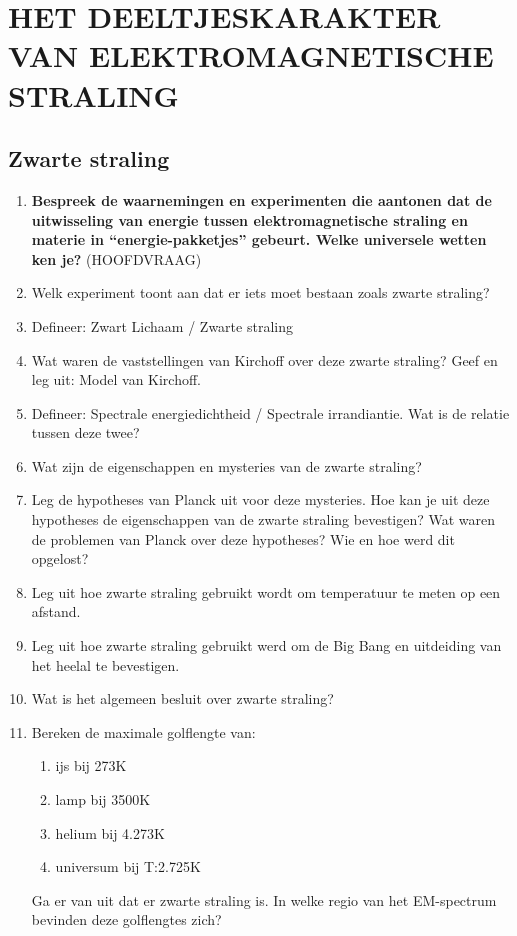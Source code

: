 \documentclass[12pt]{article}
\begin{document}
    \maketitle

    \section{HET DEELTJESKARAKTER VAN ELEKTROMAGNETISCHE STRALING}
    \subsection{Zwarte straling}
    \begin{enumerate}
        \item \textbf{Bespreek de waarnemingen en experimenten die aantonen dat de uitwisseling van energie tussen elektromagnetische straling en materie in “energie-pakketjes” gebeurt. Welke universele wetten ken je?} (HOOFDVRAAG)
        \item Welk experiment toont aan dat er iets moet bestaan zoals zwarte straling?
        \item Defineer: Zwart Lichaam / Zwarte straling
        \item Wat waren de vaststellingen van Kirchoff over deze zwarte straling? Geef en leg uit: Model van Kirchoff.
        \item Defineer: Spectrale energiedichtheid / Spectrale irrandiantie. Wat is de relatie tussen deze twee?
        \item Wat zijn de eigenschappen en mysteries van de zwarte straling?
        \item Leg de hypotheses van Planck uit voor deze mysteries. Hoe kan je uit deze hypotheses de eigenschappen van de zwarte straling bevestigen? Wat waren de problemen van Planck over deze hypotheses? Wie en hoe werd dit opgelost?
        \item Leg uit hoe zwarte straling gebruikt wordt om temperatuur te meten op een afstand.
        \item Leg uit hoe zwarte straling gebruikt werd om de Big Bang en uitdeiding van het heelal te bevestigen.
        \item Wat is het algemeen besluit over zwarte straling?

        \item Bereken de maximale golflengte van:
            \begin{enumerate}
                \item ijs bij 273K
                \item lamp bij 3500K
                \item helium bij 4.273K
                \item universum bij T:2.725K
            \end{enumerate}
            Ga er van uit dat er zwarte straling is. In welke regio van het EM-spectrum bevinden deze golflengtes zich?
    \end{enumerate}
\end{document}

